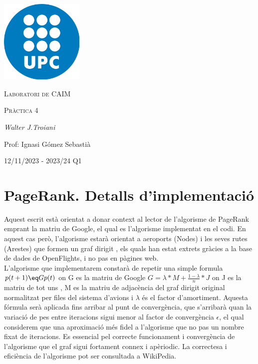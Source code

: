 \documentclass[12pt]{article}
\begin{document}
\begin{titlepage}
	\centering
	\includegraphics[width=0.3\textwidth]{university.png}\par\vspace{1cm}
	{\scshape\LARGE Laboratori de CAIM \par}
	\vspace{1cm}
	{\scshape\Large Pràctica 4\par}
	\vspace{1.5cm}
	{\Large\itshape Walter J.Troiani\par}
	\vfill
	Prof: Ignasi Gómez Sebastià\par
    \vspace{1cm}
    12/11/2023 - 2023/24 Q1\par
	\vspace{1cm}

\end{titlepage}

\newpage

\section{PageRank. Detalls d'implementació}

Aquest escrit està orientat a donar context al lector de l'algorisme de PageRank emprant la matriu de Google, el qual es l'algorisme implementat en el codi. En aquest cas però, l'algorisme estarà orientat a aeroports (Nodes) i les seves rutes (Arestes) que formen un graf dirigit , els quals han estat extrets gràcies a la base de dades de OpenFlights, i no pas en pàgines web.
\\ 

L'algorisme que implementarem constarà de repetir una simple formula $p(t+1) \eq G p(t)$ on G es la matriu de Google $G = \lambda * M + \frac{1 - \lambda}{n} * J$ on J es la matriu de tot uns , M es la matriu de adjacència del graf dirigit original normalitzat per files del sistema d'avions i $\lambda$ és el factor d'amortiment. Aquesta fórmula serà aplicada fins arribar al punt de convergència, que s'arribarà quan la variació de pes entre iteracions sigui menor al factor de convergència $\epsilon$, el qual considerem que una aproximació més fidel a l'algorisme que no pas un nombre fixat de iteracions. Es essencial pel correcte funcionament i convergència de l'algorisme que el graf sigui fortament connex i apèriodic. La correctesa i eficiència de l'algorisme pot ser consultada a WikiPedia. 
\\ 
\end{document}
